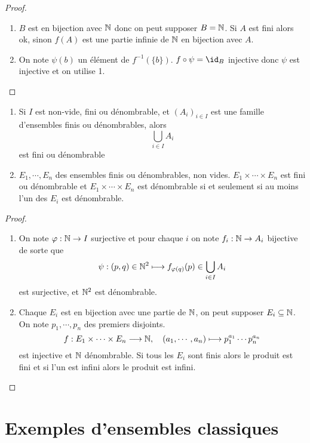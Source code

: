 \begin{proof}~
    \begin{enumerate}
        \item $B$ est en bijection avec $\mathbb N$ donc on peut supposer $B=\mathbb N$. Si $A$ est fini alors ok, sinon $f(A)$ est une partie infinie de $\mathbb N$ en bijection avec $A$.
        \item On note $\psi(b)$ un élément de $f^{-1}(\{b\})$. $f\circ \psi=\id_B$ injective donc $\psi$ est injective et on utilise 1.
    \end{enumerate}
\end{proof}

\begin{prop}
    \begin{enumerate}
        \item Si $I$ est non-vide, fini ou dénombrable, et $(A_i)_{i\in I}$ est une famille d'ensembles finis ou dénombrables, alors \[
                \bigcup_{i\in I}A_i
            \]
            est fini ou dénombrable
        \item $E_1,\cdots, E_n$ des ensembles finis ou dénombrables, non vides. $E_1\times \cdots \times E_n$ est fini ou dénombrable et $E_1\times \cdots \times E_n$ est dénombrable si et seulement si au moins l'un des $E_i$ est dénombrable.
    \end{enumerate}
\end{prop}

\begin{proof}~
    \begin{enumerate}
        \item On note $\varphi:\mathbb N\to I$ surjective et pour chaque $i$ on note $f_i:\mathbb N\to A_i$ bijective de sorte que \[
        \psi: (p, q)\in\mathbb N^2\longmapsto f_{\varphi(q)}(p)\in\bigcup_{i\in I}A_i
            \]
            est surjective, et $\mathbb N^2$ est dénombrable.
        \item Chaque $E_i$ est en bijection avec une partie de $\mathbb N$, on peut supposer $E_i\subseteq \mathbb N$. On note $p_1, \cdots, p_n$ des premiers disjoints. \[
                f: E_1\times \cdots \times E_n\longrightarrow \mathbb N, \quad (a_1, \cdots, a_n)\longmapsto p_1^{a_1}\cdots p_n^{a_n}
            \]
            est injective et $\mathbb N$ dénombrable. Si tous les $E_i$ sont finis alors le produit est fini et si l'un est infini alors le produit est infini.
    \end{enumerate}
\end{proof}

\section{Exemples d'ensembles classiques}

